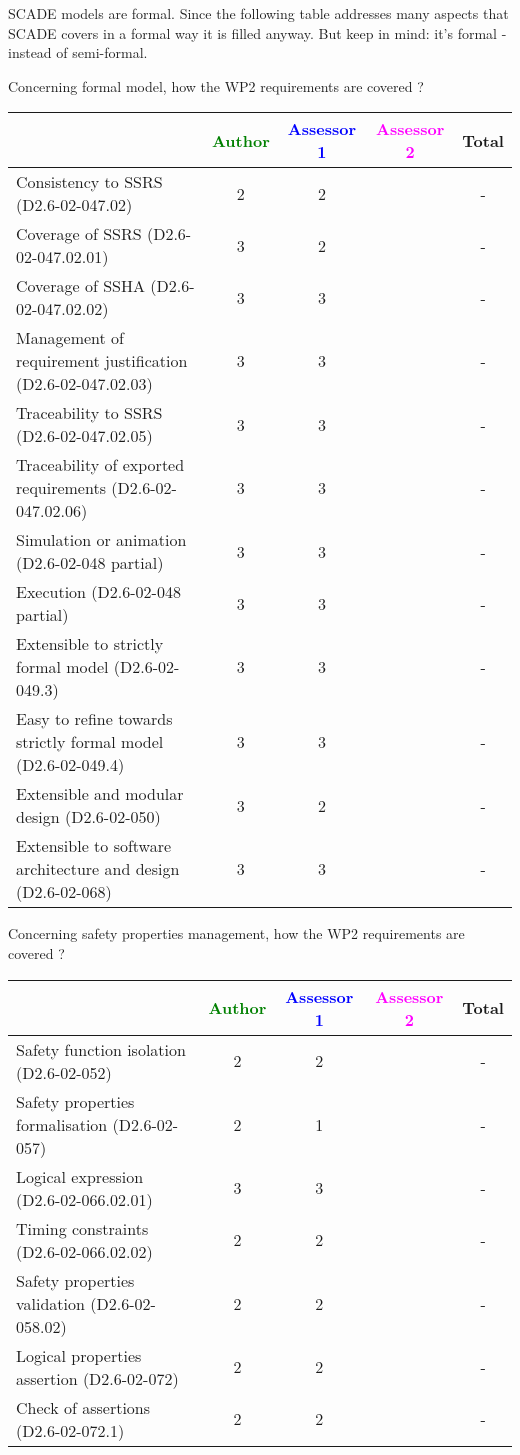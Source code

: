 \begin{author_comment}
SCADE models are formal. Since the following table addresses many aspects that SCADE covers in a formal way it is filled anyway. But keep in mind: it's formal - instead of semi-formal.  
\end{author_comment}


Concerning formal model, how the WP2 requirements are covered ?

\begin{tabular}{|l | c | c | c | c|}
\hline
& \textcolor{green}{Author} & \textcolor{blue}{Assessor 1} & \textcolor{magenta}{Assessor 2} & Total \\
\hline 
Consistency to SSRS (D2.6-02-047.02) & 2    & 2    & & - \\
\hline
Coverage of SSRS (D2.6-02-047.02.01)  & 3    & 2    & & - \\
\hline
Coverage of SSHA (D2.6-02-047.02.02)  &  3& 3    & & - \\
\hline
Management of requirement justification (D2.6-02-047.02.03)  &
3& 3    & & - \\
\hline
Traceability to  SSRS (D2.6-02-047.02.05)  &  3& 3    & & - \\
\hline
Traceability of exported requirements (D2.6-02-047.02.06)  &
3& 3    & & - \\
\hline
Simulation or animation (D2.6-02-048 partial)  &  3&
3& & - \\
\hline
Execution (D2.6-02-048 partial)  & 3    & 3    & & - \\
\hline
Extensible to strictly formal model (D2.6-02-049.3) &
3  & 3    & & - \\
\hline
Easy to  refine towards strictly formal model (D2.6-02-049.4) &
3 & 3    & & - \\
\hline
Extensible and modular design (D2.6-02-050)  & 3    & 2    & & - \\
\hline
Extensible to software architecture and design (D2.6-02-068)   &
3& 3    & & - \\
\hline
\end{tabular}

Concerning safety properties management, how the WP2 requirements are covered ?

\begin{tabular}{|l | c | c | c | c|}
\hline
& \textcolor{green}{Author} & \textcolor{blue}{Assessor 1} & \textcolor{magenta}{Assessor 2} & Total \\
\hline 
Safety function isolation (D2.6-02-052)  &  2& 2    & & - \\
\hline 
Safety properties formalisation (D2.6-02-057)  &  2&
1 & & - \\
\hline
Logical expression (D2.6-02-066.02.01)  &  3& 3    & & - \\
\hline
Timing constraints (D2.6-02-066.02.02)  &  2 & 2    & & - \\
\hline
Safety properties validation (D2.6-02-058.02)  &  2& 2    & & - \\
\hline
Logical properties assertion (D2.6-02-072)  &  2& 2    & & - \\
\hline
Check  of assertions (D2.6-02-072.1)  &  2& 2    & & - \\
\hline
\end{tabular}

